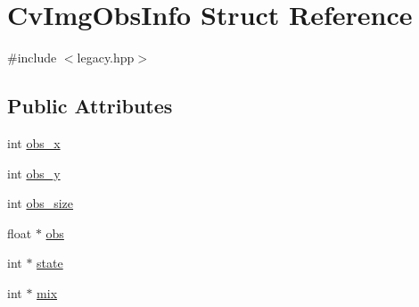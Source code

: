 \hypertarget{structCvImgObsInfo}{\section{Cv\-Img\-Obs\-Info Struct Reference}
\label{structCvImgObsInfo}
}


{\ttfamily \#include $<$legacy.\-hpp$>$}

\subsection*{Public Attributes}
\begin{DoxyCompactItemize}
\item 
int \hyperlink{structCvImgObsInfo_ab59ce8a12a9853445fedbe3fc10c9601}{obs\-\_\-x}
\item 
int \hyperlink{structCvImgObsInfo_af926497a39e7abe5d707a9ad082882bc}{obs\-\_\-y}
\item 
int \hyperlink{structCvImgObsInfo_a2f2a1ec7d4a57340ad7b753bfb1e5efe}{obs\-\_\-size}
\item 
float $\ast$ \hyperlink{structCvImgObsInfo_a89f0fc6c28d37239bbfb27740ce891b5}{obs}
\item 
int $\ast$ \hyperlink{structCvImgObsInfo_a2ebc3a7cc6e29a9c57b6e356f09b73ce}{state}
\item 
int $\ast$ \hyperlink{structCvImgObsInfo_a30c5759006567c40458647ca51a13952}{mix}
\end{DoxyCompactItemize}


